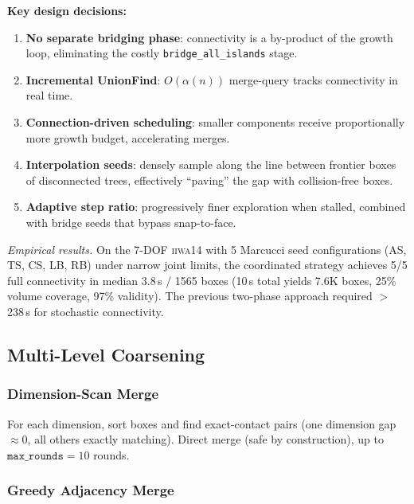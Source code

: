 \documentclass[journal]{IEEEtran}
\begin{document}
\textbf{Key design decisions:}
\begin{enumerate}[nosep]
  \item \textbf{No separate bridging phase}: connectivity is a
    by-product of the growth loop, eliminating the costly
    \texttt{bridge\_all\_islands} stage.
  \item \textbf{Incremental UnionFind}: $O(\alpha(n))$ merge-query
    tracks connectivity in real time.
  \item \textbf{Connection-driven scheduling}: smaller components
    receive proportionally more growth budget, accelerating merges.
  \item \textbf{Interpolation seeds}: densely sample along the line
    between frontier boxes of disconnected trees, effectively
    ``paving'' the gap with collision-free boxes.
  \item \textbf{Adaptive step ratio}: progressively finer exploration
    when stalled, combined with bridge seeds that bypass snap-to-face.
\end{enumerate}

\emph{Empirical results.}
On the 7-DOF \textsc{iiwa14} with 5 Marcucci seed configurations
(AS, TS, CS, LB, RB) under narrow joint limits, the coordinated
strategy achieves 5/5 full connectivity in median 3.8\,s / 1565 boxes
(10\,s total yields 7.6K boxes, 25\% volume coverage, 97\% validity).
The previous two-phase approach required $>$238\,s for stochastic
connectivity.

\subsection{Multi-Level Coarsening}

\subsubsection{Dimension-Scan Merge}

For each dimension, sort boxes and find exact-contact pairs (one
dimension gap $\approx 0$, all others exactly matching).
Direct merge (safe by construction), up to
$\texttt{max\_rounds} = 10$ rounds.

\subsubsection{Greedy Adjacency Merge}
\end{document}

